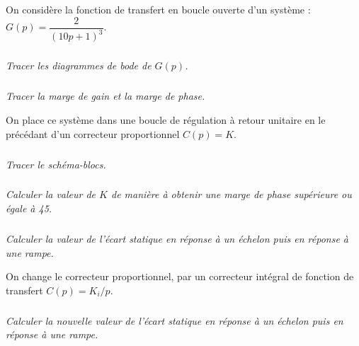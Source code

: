\documentclass[10pt,fleqn]{article} %
\begin{document}

\vspace{5cm}
\pagestyle{fancy}
\thispagestyle{plain}

\def\columnseprulecolor{\color{ocre}}
\setlength{\columnseprule}{0.4pt} 

\def\pathfig{images}

\begin{multicols}{2}

On considère la fonction de transfert en boucle ouverte d’un système : $G(p)=\dfrac{2}{\left(10 p +1\right)^3}$.

\subparagraph{}
\textit{Tracer les diagrammes de bode de $G(p)$.}
\ifprof
\begin{corrige}
\end{corrige}
\else
\fi

\subparagraph{}
\textit{Tracer la marge de gain et la marge de phase.}
\ifprof
\begin{corrige}
\end{corrige}
\else
\fi

On place ce système dans une boucle de régulation à retour unitaire en le précédant d’un correcteur proportionnel $C(p)=K$. 

\subparagraph{}
\textit{Tracer le schéma-blocs.}
\ifprof
\begin{corrige}
\end{corrige}
\else
\fi

\subparagraph{}
\textit{Calculer la valeur de $K$ de manière à obtenir une marge de phase supérieure ou égale à 45\degres.}
\ifprof
\begin{corrige}
\end{corrige}
\else
\fi

\subparagraph{}
\textit{Calculer la valeur de l’écart statique en réponse à un échelon puis en réponse à une rampe.}
\ifprof
\begin{corrige}
\end{corrige}
\else
\fi

On change le correcteur proportionnel, par un correcteur intégral de fonction de transfert $C(p)=K_i/p$.
\subparagraph{}
\textit{Calculer la nouvelle valeur de l’écart statique en réponse à un échelon puis en réponse à une rampe.}
\ifprof
\begin{corrige}
\end{corrige}
\else
\fi

\end{multicols}
%
%
%
%
\end{document}
